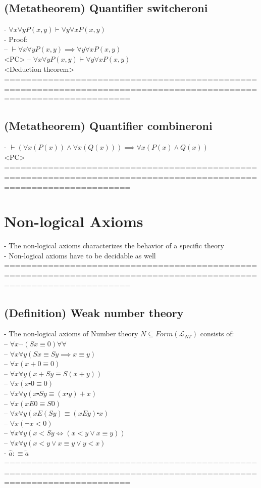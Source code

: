 \documentclass{book}
\newcommand{\is}{:\equiv}
\begin{document}
\subsection{(Metatheorem) Quantifier switcheroni} %
	- $\forall x \forall y P(x, y) \vdash \forall y \forall x P(x, y)$ \\
	- Proof: \\
		 -- $\vdash \forall x \forall y P(x, y) \implies \forall y \forall x P(x, y)$ \\ <PC>
		 -- $\forall x \forall y P(x, y) \vdash \forall y \forall x P(x, y)$ \\ <Deduction theorem>
	===================================================================================================================
\subsection{(Metatheorem) Quantifier combineroni} %
	- $\vdash (\forall x (P(x)) \land \forall x (Q(x))) \implies \forall x (P(x) \land Q(x))$ \\ <PC>
	===================================================================================================================

\section{Non-logical Axioms}
	- The non-logical axioms characterizes the behavior of a specific theory \\
	- Non-logical axioms have to be decidable as well \\
	===================================================================================================================
\subsection{(Definition) Weak number theory} %
	- The non-logical axioms of Number theory $N \subseteq Form(\mathcal{L}_{NT})$ consists of: \\
		-- $\forall x \lnot (S x \equiv 0) \forall \forall $ \\
		-- $\forall x \forall y (S x \equiv S y \implies x \equiv y)$ \\
		-- $\forall x (x + 0 \equiv 0)$ \\
		-- $\forall x \forall y (x + S y \equiv S (x + y))$ \\
		-- $\forall x (x \centerdot 0 \equiv 0)$ \\
		-- $\forall x \forall y (x \centerdot S y \equiv (x \centerdot y) + x)$ \\
		-- $\forall x (x E 0 \equiv S 0)$ \\
		-- $\forall x \forall y (x E (S y) \equiv (x E y) \centerdot x)$ \\
		-- $\forall x (\lnot x < 0)$ \\
		-- $\forall x \forall y (x < S y \iff (x < y \lor x \equiv y))$ \\
		-- $\forall x \forall y (x < y \lor x \equiv y \lor y < x)$ \\
	- $\hat{a} \is \overleftarrow{a}$ \\
	===================================================================================================================
\end{document}
